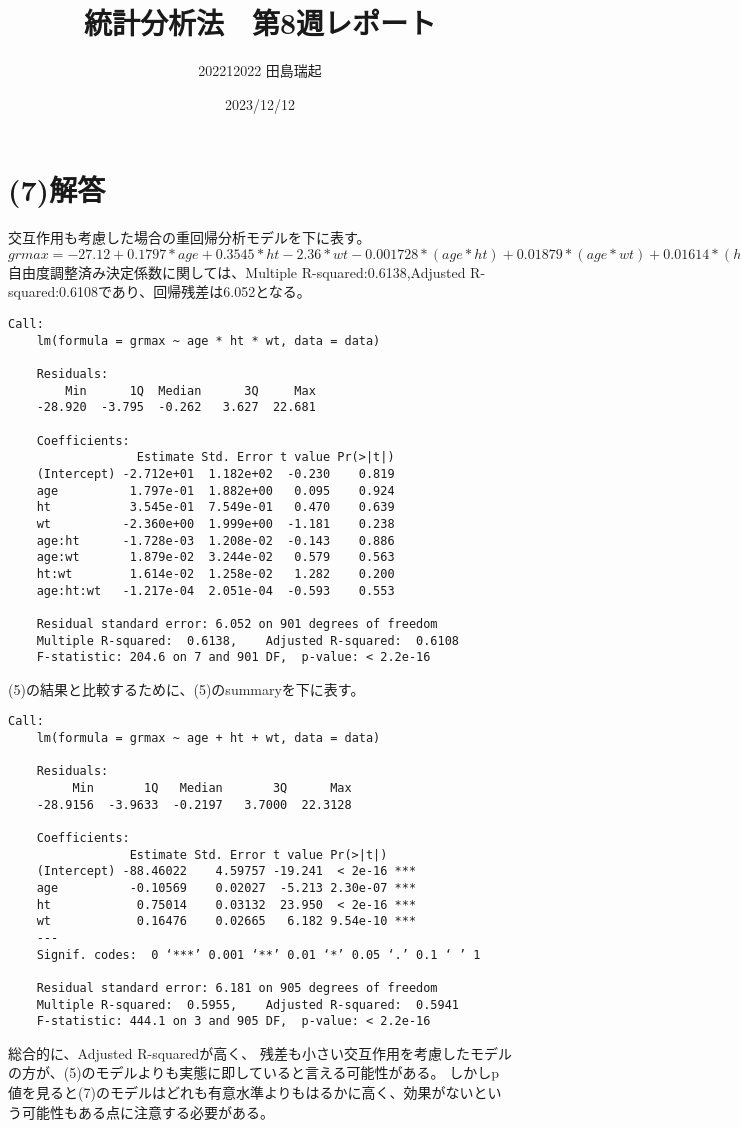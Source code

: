 \documentclass[fontsize = 8pt, paper= a4]{jlreq}
\begin{document}
\title{統計分析法　第8週レポート}
\author{202212022 田島瑞起}
\date{2023/12/12}
\maketitle
\section{(7)解答}
交互作用も考慮した場合の重回帰分析モデルを下に表す。
$grmax = -27.12+0.1797*age+0.3545*ht-2.36*wt-0.001728*(age*ht)+0.01879*(age*wt)+0.01614*(ht*wt)-0.0001217*(age*ht*wt)$
自由度調整済み決定係数に関しては、Multiple R-squared:0.6138,Adjusted R-squared:0.6108であり、回帰残差は6.052となる。
\begin{lstlisting}[basicstyle=\ttfamily\footnotesize, frame=single]
    Call:
    lm(formula = grmax ~ age * ht * wt, data = data)
    
    Residuals:
        Min      1Q  Median      3Q     Max 
    -28.920  -3.795  -0.262   3.627  22.681 
    
    Coefficients:
                  Estimate Std. Error t value Pr(>|t|)
    (Intercept) -2.712e+01  1.182e+02  -0.230    0.819
    age          1.797e-01  1.882e+00   0.095    0.924
    ht           3.545e-01  7.549e-01   0.470    0.639
    wt          -2.360e+00  1.999e+00  -1.181    0.238
    age:ht      -1.728e-03  1.208e-02  -0.143    0.886
    age:wt       1.879e-02  3.244e-02   0.579    0.563
    ht:wt        1.614e-02  1.258e-02   1.282    0.200
    age:ht:wt   -1.217e-04  2.051e-04  -0.593    0.553
    
    Residual standard error: 6.052 on 901 degrees of freedom
    Multiple R-squared:  0.6138,    Adjusted R-squared:  0.6108 
    F-statistic: 204.6 on 7 and 901 DF,  p-value: < 2.2e-16
\end{lstlisting}
(5)の結果と比較するために、(5)のsummaryを下に表す。
\begin{lstlisting}[basicstyle=\ttfamily\footnotesize, frame=single]
    Call:
    lm(formula = grmax ~ age + ht + wt, data = data)
    
    Residuals:
         Min       1Q   Median       3Q      Max 
    -28.9156  -3.9633  -0.2197   3.7000  22.3128 
    
    Coefficients:
                 Estimate Std. Error t value Pr(>|t|)    
    (Intercept) -88.46022    4.59757 -19.241  < 2e-16 ***
    age          -0.10569    0.02027  -5.213 2.30e-07 ***
    ht            0.75014    0.03132  23.950  < 2e-16 ***
    wt            0.16476    0.02665   6.182 9.54e-10 ***
    ---
    Signif. codes:  0 ‘***’ 0.001 ‘**’ 0.01 ‘*’ 0.05 ‘.’ 0.1 ‘ ’ 1
    
    Residual standard error: 6.181 on 905 degrees of freedom
    Multiple R-squared:  0.5955,    Adjusted R-squared:  0.5941 
    F-statistic: 444.1 on 3 and 905 DF,  p-value: < 2.2e-16    
\end{lstlisting}
総合的に、Adjusted R-squaredが高く、
残差も小さい交互作用を考慮したモデルの方が、(5)のモデルよりも実態に即していると言える可能性がある。
しかしp値を見ると(7)のモデルはどれも有意水準よりもはるかに高く、効果がないという可能性もある点に注意する必要がある。
\end{document}
